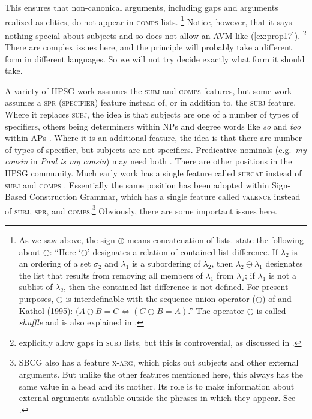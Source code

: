 \documentclass[output=paper
	        ,collection
	        ,collectionchapter
 	        ,biblatex
                ,babelshorthands
                ,newtxmath
                ,draftmode
                ,colorlinks, citecolor=brown
]{langscibook}
\begin{document}
\noindent
This ensures that non-canonical arguments, including gaps and arguments realized as clitics, do not appear in \textsc{comps} lists.%
%
\footnote{As we saw above, the sign $\oplus$ means concatenation of lists. \citet[]{GSag2000a-u} state the
  following about $\ominus$: ``Here `$\ominus$' designates a relation of contained list difference. If
$\lambda_2$ is an ordering of a set $\sigma_2$ and $\lambda_1$ is a subordering of $\lambda_2$, then
$\lambda_2 \ominus \lambda_1$ designates the list that results from removing all members of
$\lambda_1$ from $\lambda_2$; if $\lambda_1$ is not a sublist of $\lambda_2$, then the contained
list difference is not defined. For present purposes, $\ominus$ is interdefinable with the sequence
union operator ($\bigcirc$\is{$\bigcirc$}) of
\citet{Reape94a} and Kathol (1995): $(A \ominus B = C \Leftrightarrow (C \bigcirc B = A)$.'' The
operator $\bigcirc$ is called \emph{shuffle} and is also explained in \crossrefchapterw[\page \pageref{rel-shuffle}]{order}.}
%
Notice, however, that it says nothing special about subjects and so does not allow an AVM like (\ref{ex:prop17}).%
%
\footnote{\citet[177--183]{GSag2000a-u} explicitly allow gaps in \textsc{subj} lists, but this is
  controversial, as discussed in \crossrefchapterw[\page
  \pageref{udc:page-subject-gaps-start}--\pageref{udc:page-subject-gaps-end}]{udc}.}
%
There are complex issues here, and the principle will probably take a different form in different languages. So we will not try decide exactly what form it should take.

A variety of HPSG work assumes the \textsc{subj} and \textsc{comps} features, but some work assumes
a \textsc{spr (specifier)} feature instead of, or in addition to, the \textsc{subj} feature. Where it
replaces \textsc{subj}, the idea is that subjects are one of a number of types of specifiers, others
being determiners within NPs and degree words like \emph{so} and \emph{too} within APs
\citep[]{ps2}. Where it is an additional feature, the idea is that there are number of
types of specifier, but subjects are not specifiers. Predicative nominals (e.g.\ \emph{my cousin} in
\emph{Paul is my cousin}) may need both
\parencites[Section~9.4.1]{ps2}[409]{GSag2000a-u}{AG2003b-u}. There are other positions in the HPSG 
community. Much early work has a single feature called \textsc{subcat}
instead of \textsc{subj} and \textsc{comps} \citep{ps}. Essentially the same position has been
adopted within Sign-Based Construction Grammar, which has a single feature called \textsc{valence}
instead of \textsc{subj}, \textsc{spr}, and \textsc{comps}.\footnote{%
  SBCG also has a feature \textsc{x-arg}, which picks out subjects and other external arguments. But
  unlike the other features mentioned here, this always has the same value in a head and its
  mother. Its role is to make information about external arguments available outside the phrases in
  which they appear.  See \citet[84, 149--151]{Sag2007a,Sag2012a}.} 
%
Obviously, there are some important issues here.
\end{document}
